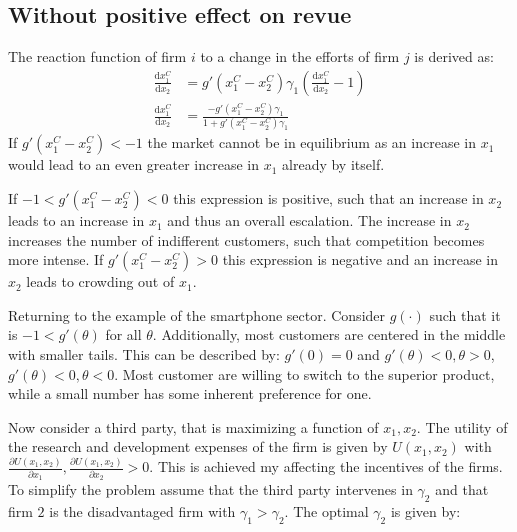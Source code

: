 \documentclass[a4paper, 11pt]{article}
\renewcommand{\d}{\text{d}}
\begin{document}
\subsection{Without positive effect on revue}
The reaction function of firm $i$ to a change in the efforts of firm $j$ is derived as:
\begin{align}
\frac{\d x_1^C}{\d x_2} &= g'(x_1^C-x_2^C)\gamma_1\left(\frac{\d x_1^C}{\d x_2}-1\right)\\
\frac{\d x_1^C}{\d x_2} &= \frac{-g'(x_1^C-x_2^C)\gamma_1}{1+g'(x_1^C-x_2^C)\gamma_1}
\end{align}
If $g'(x_1^C-x_2^C)<-1$ the market cannot be in equilibrium as an increase in $x_1$ would lead to an even greater increase in $x_1$ already by itself.

If $-1<g'(x_1^C-x_2^C)<0$ this expression is positive, such that an increase in $x_2$ leads to an increase in $x_1$ and thus an overall escalation. The increase in $x_2$ increases the number of indifferent customers, such that competition becomes more intense. If $g'(x_1^C-x_2^C)>0$ this expression is negative and an increase in $x_2$ leads to crowding out of $x_1$. 

Returning to the example of the smartphone sector. Consider $g(\cdot)$ such that it is $-1<g'(\theta)$ for all $\theta$. Additionally, most customers are centered in the middle with smaller tails. This can be described by: $g'(0)=0$ and $g'(\theta)<0, \theta>0$,$g'(\theta)<0, \theta<0$. Most customer are willing to switch to the superior product, while a small number has some inherent preference for one.

Now consider a third party, that is maximizing a function of $x_1, x_2$. The utility of the research and development expenses of the firm is given by $U(x_1,x_2)$ with $\frac{\partial U(x_1,x_2)}{\partial x_1},\frac{\partial U(x_1,x_2)}{\partial x_2}>0$. This is achieved my affecting the incentives of the firms. To simplify the problem assume that the third party intervenes in $\gamma_2$ and that firm $2$ is the disadvantaged firm with $\gamma_1>\gamma_2$. The optimal $\gamma_2$ is given by:
\end{document}
